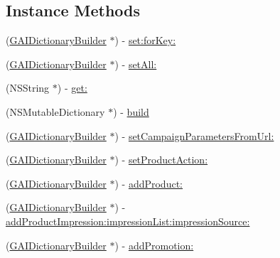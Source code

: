 \subsection*{Instance Methods}
\begin{DoxyCompactItemize}
\item 
(\hyperlink{interface_g_a_i_dictionary_builder}{G\+A\+I\+Dictionary\+Builder} $\ast$) -\/ \hyperlink{interface_g_a_i_dictionary_builder_a4a54d53231f907c632641dcc462a2c86}{set\+:for\+Key\+:}
\item 
(\hyperlink{interface_g_a_i_dictionary_builder}{G\+A\+I\+Dictionary\+Builder} $\ast$) -\/ \hyperlink{interface_g_a_i_dictionary_builder_a8201487fc71afe66736ab388bf412e50}{set\+All\+:}
\item 
(N\+S\+String $\ast$) -\/ \hyperlink{interface_g_a_i_dictionary_builder_ae26c0c8d91b6f5d2baa09e2126a14512}{get\+:}
\item 
(N\+S\+Mutable\+Dictionary $\ast$) -\/ \hyperlink{interface_g_a_i_dictionary_builder_ac56ea44d460f729d1298d52d56d34cd9}{build}
\item 
(\hyperlink{interface_g_a_i_dictionary_builder}{G\+A\+I\+Dictionary\+Builder} $\ast$) -\/ \hyperlink{interface_g_a_i_dictionary_builder_a58ad2b7a5a8279588214af3b94a2e60a}{set\+Campaign\+Parameters\+From\+Url\+:}
\item 
(\hyperlink{interface_g_a_i_dictionary_builder}{G\+A\+I\+Dictionary\+Builder} $\ast$) -\/ \hyperlink{interface_g_a_i_dictionary_builder_a11fcf09c3322830c93560ca11c1b0979}{set\+Product\+Action\+:}
\item 
(\hyperlink{interface_g_a_i_dictionary_builder}{G\+A\+I\+Dictionary\+Builder} $\ast$) -\/ \hyperlink{interface_g_a_i_dictionary_builder_ae87ab67f665b29378b76be8d0c817379}{add\+Product\+:}
\item 
(\hyperlink{interface_g_a_i_dictionary_builder}{G\+A\+I\+Dictionary\+Builder} $\ast$) -\/ \hyperlink{interface_g_a_i_dictionary_builder_a97327f7a0253452b9229d0d8605516e4}{add\+Product\+Impression\+:impression\+List\+:impression\+Source\+:}
\item 
(\hyperlink{interface_g_a_i_dictionary_builder}{G\+A\+I\+Dictionary\+Builder} $\ast$) -\/ \hyperlink{interface_g_a_i_dictionary_builder_a5c7297729621d0f4fd019a1fcfda052f}{add\+Promotion\+:}
\end{DoxyCompactItemize}
